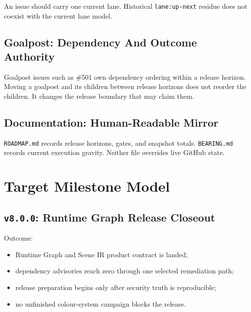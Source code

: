 An issue should carry one current lane. Historical \texttt{l\allowbreak{}a\allowbreak{}n\allowbreak{}e\allowbreak{}:\allowbreak{}u\allowbreak{}p\allowbreak{}-\allowbreak{}n\allowbreak{}e\allowbreak{}x\allowbreak{}t} residue does not coexist with the current lane model.

\subsection{Goalpost: Dependency And Outcome Authority}\label{record-249-goalpost-dependency-and-outcome-authority}

Goalpost issues such as \#501 own dependency ordering within a release horizon. Moving a goalpost and its children between release horizons does not reorder the children. It changes the release boundary that may claim them.

\subsection{Documentation: Human-Readable Mirror}\label{record-249-documentation-human-readable-mirror}

\texttt{R\allowbreak{}O\allowbreak{}A\allowbreak{}D\allowbreak{}M\allowbreak{}A\allowbreak{}P\allowbreak{}.\allowbreak{}m\allowbreak{}d} records release horizons, gates, and snapshot totals. \texttt{B\allowbreak{}E\allowbreak{}A\allowbreak{}R\allowbreak{}I\allowbreak{}N\allowbreak{}G\allowbreak{}.\allowbreak{}m\allowbreak{}d} records current execution gravity. Neither file overrides live GitHub state.

\section{Target Milestone Model}\label{record-249-target-milestone-model}

\subsection{\texorpdfstring{\texttt{v\allowbreak{}8\allowbreak{}.\allowbreak{}0\allowbreak{}.\allowbreak{}0}: Runtime Graph Release Closeout}{: Runtime Graph Release Closeout}}\label{record-249-v8.0.0-runtime-graph-release-closeout}

Outcome:

\begin{itemize}
\tightlist
\item
  Runtime Graph and Scene IR product contract is landed;
\item
  dependency advisories reach zero through one selected remediation path;
\item
  release preparation begins only after security truth is reproducible;
\item
  no unfinished colour-system campaign blocks the release.
\end{itemize}

